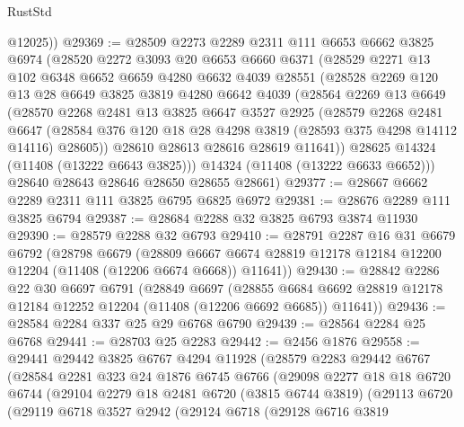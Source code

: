 \begin{lexlean}{RustStd}
\begin{coremodule}
        @12025))
@29369 := @28509
    @2273
    @2289
    @2311
    @111
    @6653
    @6662
    @3825
    @6974
    (@28520
      @2272
      @3093
      @20
      @6653
      @6660
      @6371
      (@28529
        @2271
        @13
        @102
        @6348
        @6652
        @6659
        @4280
        @6632
        @4039
        @28551
        (@28528
          @2269
          @120
          @13
          @28
          @6649
          @3825
          @3819
          @4280
          @6642
          @4039
          (@28564
            @2269
            @13
            @6649
            (@28570
              @2268
              @2481
              @13
              @3825
              @6647
              @3527
              @2925
              (@28579
                @2268
                @2481
                @6647
                (@28584 @376 @120 @18 @28 @4298 @3819 (@28593 @375 @4298 @14112 @14116) @28605))
              @28610
              @28613
              @28616
              @28619
              @11641))
          @28625
          @14324
          (@11408 (@13222 @6643 @3825)))
        @14324
        (@11408 (@13222 @6633 @6652)))
      @28640
      @28643
      @28646
      @28650
      @28655
      @28661)
@29377 := @28667 @6662 @2289 @2311 @111 @3825 @6795 @6825 @6972
@29381 := @28676 @2289 @111 @3825 @6794
@29387 := @28684 @2288 @32 @3825 @6793 @3874 @11930
@29390 := @28579 @2288 @32 @6793
@29410 := @28791
    @2287
    @16
    @31
    @6679
    @6792
    (@28798
      @6679
      (@28809 @6667 @6674 @28819 @12178 @12184 @12200 @12204 (@11408 (@12206 @6674 @6668)) @11641))
@29430 := @28842
    @2286
    @22
    @30
    @6697
    @6791
    (@28849
      @6697
      (@28855 @6684 @6692 @28819 @12178 @12184 @12252 @12204 (@11408 (@12206 @6692 @6685)) @11641))
@29436 := @28584 @2284 @337 @25 @29 @6768 @6790
@29439 := @28564 @2284 @25 @6768
@29441 := @28703 @25 @2283
@29442 := @2456 @1876
@29558 := @29441
    @29442
    @3825
    @6767
    @4294
    @11928
    (@28579
      @2283
      @29442
      @6767
      (@28584
        @2281
        @323
        @24
        @1876
        @6745
        @6766
        (@29098
          @2277
          @18
          @18
          @6720
          @6744
          (@29104
            @2279
            @18
            @2481
            @6720
            (@3815 @6744 @3819)
            (@29113
              @6720
              (@29119
                @6718
                @3527
                @2942
                (@29124
                  @6718
                  (@29128
                    @6716
                    @3819

\end{coremodule}
\end{lexlean}
